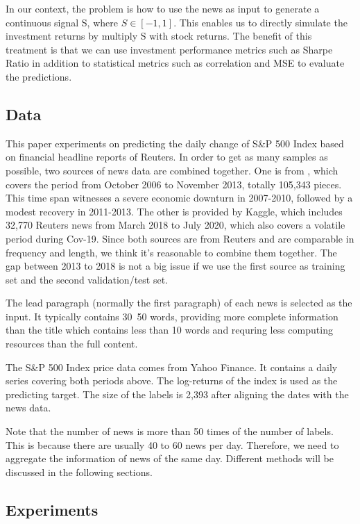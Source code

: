 \documentclass[11pt]{article}
\begin{document}
In our context, the problem is how to use the news as input to generate a continuous signal S, where $S \in [-1,1]$. This enables us to directly simulate the investment returns by multiply S with stock returns. The benefit of this treatment is that we can use investment performance metrics such as Sharpe Ratio in addition to statistical metrics such as correlation and MSE to evaluate the predictions.


\subsection{Data}

This paper experiments on predicting the daily change of S\&P 500 Index based on financial headline reports of Reuters. In order to get as many samples as possible, two sources of news data are combined together. One is from \citet{ding-etal-2014-using}, which covers the period from October 2006 to November 2013, totally 105,343 pieces. This time span witnesses a severe economic downturn in 2007-2010, followed by a modest recovery in 2011-2013. The other is provided by Kaggle, which includes 32,770 Reuters news from March 2018 to July 2020, which also covers a volatile period during Cov-19. Since both sources are from Reuters and are comparable in frequency and length, we think it's reasonable to combine them together. The gap between 2013 to 2018 is not a big issue if we use the first source as training set and the second validation/test set. 

The lead paragraph (normally the first paragraph) of each news is selected as the input. It typically contains 30~50 words, providing more complete information than the title which contains less than 10 words and requring less computing resources than the full content.

The S\&P 500 Index price data comes from Yahoo Finance. It contains a daily series covering both periods above. The log-returns of the index is used as the predicting target. The size of the labels is 2,393 after aligning the dates with the news data. 

Note that the number of news is more than 50 times of the number of labels. This is because there are usually 40 to 60 news per day. Therefore, we need to aggregate the information of news of the same day. Different methods will be discussed in the following sections. 

\subsection{Experiments}
\end{document}
